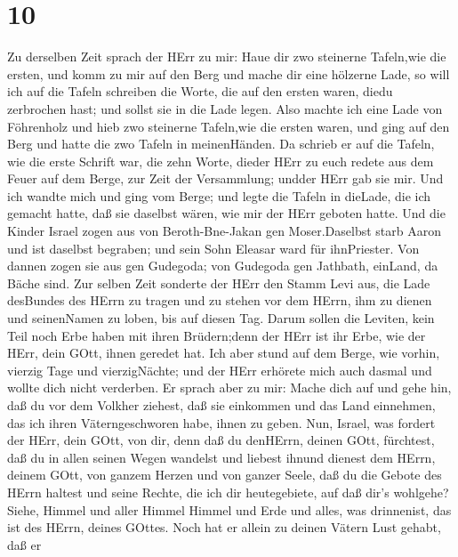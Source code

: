 \hypertarget{section-9}{%
\section{10}\label{section-9}}

 Zu derselben Zeit sprach der HErr zu mir: Haue dir zwo
steinerne Tafeln,wie die ersten, und komm zu mir auf den Berg und mache
dir eine hölzerne Lade,  so will ich auf die Tafeln
schreiben die Worte, die auf den ersten waren, diedu zerbrochen hast;
und sollst sie in die Lade legen.  Also machte ich eine Lade
von Föhrenholz und hieb zwo steinerne Tafeln,wie die ersten waren, und
ging auf den Berg und hatte die zwo Tafeln in meinenHänden. 
Da schrieb er auf die Tafeln, wie die erste Schrift war, die zehn Worte,
dieder HErr zu euch redete aus dem Feuer auf dem Berge, zur Zeit der
Versammlung; undder HErr gab sie mir.  Und ich wandte mich
und ging vom Berge; und legte die Tafeln in dieLade, die ich gemacht
hatte, daß sie daselbst wären, wie mir der HErr geboten hatte.
 Und die Kinder Israel zogen aus von Beroth-Bne-Jakan gen
Moser.Daselbst starb Aaron und ist daselbst begraben; und sein Sohn
Eleasar ward für ihnPriester.  Von dannen zogen sie aus gen
Gudegoda; von Gudegoda gen Jathbath, einLand, da Bäche sind.
 Zur selben Zeit sonderte der HErr den Stamm Levi aus, die
Lade desBundes des HErrn zu tragen und zu stehen vor dem HErrn, ihm zu
dienen und seinenNamen zu loben, bis auf diesen Tag.  Darum
sollen die Leviten, kein Teil noch Erbe haben mit ihren Brüdern;denn der
HErr ist ihr Erbe, wie der HErr, dein GOtt, ihnen geredet hat.
 Ich aber stund auf dem Berge, wie vorhin, vierzig Tage und
vierzigNächte; und der HErr erhörete mich auch dasmal und wollte dich
nicht verderben.  Er sprach aber zu mir: Mache dich auf und
gehe hin, daß du vor dem Volkher ziehest, daß sie einkommen und das Land
einnehmen, das ich ihren Väterngeschworen habe, ihnen zu geben.
 Nun, Israel, was fordert der HErr, dein GOtt, von dir,
denn daß du denHErrn, deinen GOtt, fürchtest, daß du in allen seinen
Wegen wandelst und liebest ihnund dienest dem HErrn, deinem GOtt, von
ganzem Herzen und von ganzer Seele,  daß du die Gebote des
HErrn haltest und seine Rechte, die ich dir heutegebiete, auf daß dir's
wohlgehe?  Siehe, Himmel und aller Himmel Himmel und Erde
und alles, was drinnenist, das ist des HErrn, deines GOttes.
 Noch hat er allein zu deinen Vätern Lust gehabt, daß er
